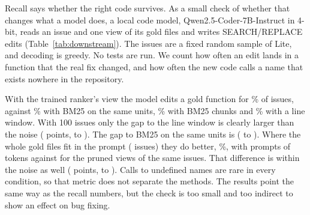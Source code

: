 \begin{table}[t]
\caption{Downstream check on 100 Lite issues: a 4-bit Qwen2.5-Coder-7B-Instruct writes SEARCH/REPLACE edits from the issue and one view of the gold files. Budget 25\% of the file tokens, at most 4{,}000. Percent of issues, except ``edits that apply'', the share of edits whose SEARCH text is found in the file. The difference is paired over the same issues. Whole files were only given when they were short enough.}
\label{tab:downstream}
\centering
\scriptsize
\setlength{\tabcolsep}{2.5pt}
\end{table}

Recall says whether the right code survives. As a small check of whether that changes what a model does, a local code model, Qwen2.5-Coder-7B-Instruct in 4-bit, reads an issue and one view of its gold files and writes SEARCH/REPLACE edits (Table~\ref{tab:downstream}). The  issues are a fixed random sample of Lite, and decoding is greedy. No tests are run. We count how often an edit lands in a function that the real fix changed, and how often the new code calls a name that exists nowhere in the repository.

With the trained ranker's view the model edits a gold function for \% of issues, against \% with BM25 on the same units, \% with BM25 chunks and \% with a line window. With 100 issues only the gap to the line window is clearly larger than the noise ( points,  to ). The gap to BM25 on the same units is  ( to ). Where the whole gold files fit in the prompt ( issues) they do better, \%, with prompts of  tokens against  for the pruned views of the same issues. That difference is within the noise as well ( points,  to ). Calls to undefined names are rare in every condition, so that metric does not separate the methods. The results point the same way as the recall numbers, but the check is too small and too indirect to show an effect on bug fixing.
